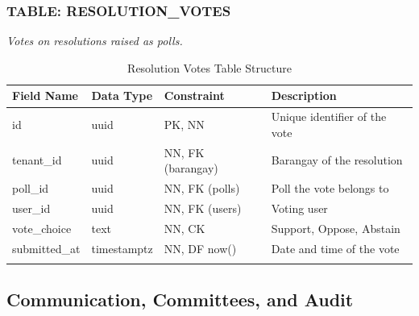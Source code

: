 \subsubsection*{TABLE: RESOLUTION\_VOTES}
\noindent\textit{Votes on resolutions raised as polls.}
\begin{longtable}{|p{3.2cm}|p{2.2cm}|p{3.2cm}|p{5.4cm}|}
\hline
\textbf{Field Name} & \textbf{Data Type} & \textbf{Constraint} & \textbf{Description} \\ \hline
\endhead
\hline \endfoot
\hline \endlastfoot
id & uuid & PK, NN & Unique identifier of the vote \\ \hline
tenant\_id & uuid & NN, FK (barangay) & Barangay of the resolution \\ \hline
poll\_id & uuid & NN, FK (polls) & Poll the vote belongs to \\ \hline
user\_id & uuid & NN, FK (users) & Voting user \\ \hline
vote\_choice & text & NN, CK & Support, Oppose, Abstain \\ \hline
submitted\_at & timestamptz & NN, DF now() & Date and time of the vote \\ \hline
\caption{Resolution Votes Table Structure}
\label{tab:resolution_votes}
\end{longtable}

\subsection{Communication, Committees, and Audit}

